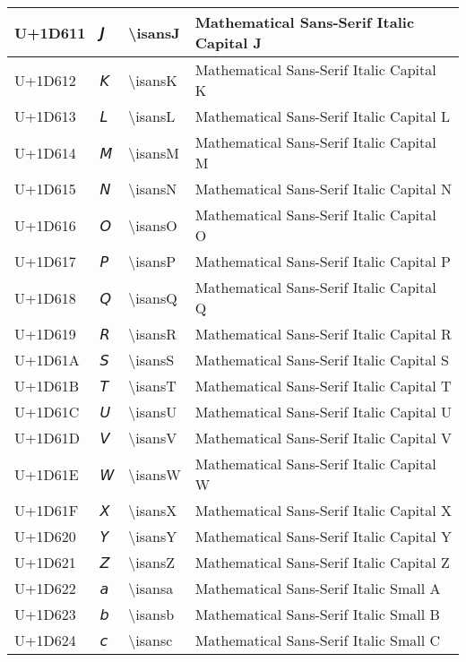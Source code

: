 \begin{table}[h]
\begin{tabulary}{\linewidth}{|L|L|L|L|}
\hline
U+1D611 & 𝘑 & {\textbackslash}isansJ & Mathematical Sans-Serif Italic Capital J \\
\hline
U+1D612 & 𝘒 & {\textbackslash}isansK & Mathematical Sans-Serif Italic Capital K \\
\hline
U+1D613 & 𝘓 & {\textbackslash}isansL & Mathematical Sans-Serif Italic Capital L \\
\hline
U+1D614 & 𝘔 & {\textbackslash}isansM & Mathematical Sans-Serif Italic Capital M \\
\hline
U+1D615 & 𝘕 & {\textbackslash}isansN & Mathematical Sans-Serif Italic Capital N \\
\hline
U+1D616 & 𝘖 & {\textbackslash}isansO & Mathematical Sans-Serif Italic Capital O \\
\hline
U+1D617 & 𝘗 & {\textbackslash}isansP & Mathematical Sans-Serif Italic Capital P \\
\hline
U+1D618 & 𝘘 & {\textbackslash}isansQ & Mathematical Sans-Serif Italic Capital Q \\
\hline
U+1D619 & 𝘙 & {\textbackslash}isansR & Mathematical Sans-Serif Italic Capital R \\
\hline
U+1D61A & 𝘚 & {\textbackslash}isansS & Mathematical Sans-Serif Italic Capital S \\
\hline
U+1D61B & 𝘛 & {\textbackslash}isansT & Mathematical Sans-Serif Italic Capital T \\
\hline
U+1D61C & 𝘜 & {\textbackslash}isansU & Mathematical Sans-Serif Italic Capital U \\
\hline
U+1D61D & 𝘝 & {\textbackslash}isansV & Mathematical Sans-Serif Italic Capital V \\
\hline
U+1D61E & 𝘞 & {\textbackslash}isansW & Mathematical Sans-Serif Italic Capital W \\
\hline
U+1D61F & 𝘟 & {\textbackslash}isansX & Mathematical Sans-Serif Italic Capital X \\
\hline
U+1D620 & 𝘠 & {\textbackslash}isansY & Mathematical Sans-Serif Italic Capital Y \\
\hline
U+1D621 & 𝘡 & {\textbackslash}isansZ & Mathematical Sans-Serif Italic Capital Z \\
\hline
U+1D622 & 𝘢 & {\textbackslash}isansa & Mathematical Sans-Serif Italic Small A \\
\hline
U+1D623 & 𝘣 & {\textbackslash}isansb & Mathematical Sans-Serif Italic Small B \\
\hline
U+1D624 & 𝘤 & {\textbackslash}isansc & Mathematical Sans-Serif Italic Small C \\
\hline

\end{tabulary}
\end{table}
